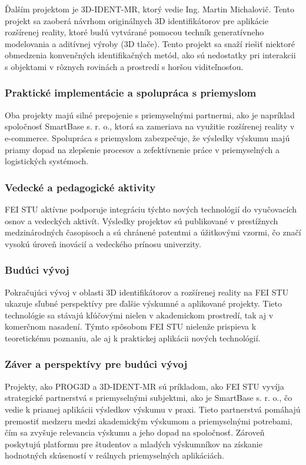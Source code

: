 Ďalším projektom je 3D-IDENT-MR, ktorý vedie Ing. Martin Michalovič. Tento projekt sa zaoberá návrhom originálnych 3D identifikátorov pre aplikácie rozšírenej reality, ktoré budú vytvárané pomocou techník generatívneho modelovania a aditívnej výroby (3D tlače). Tento projekt sa snaží riešiť niektoré obmedzenia konvenčných identifikačných metód, ako sú nedostatky pri interakcii s objektami v rôznych rovinách a prostredí s horšou viditeľnosťou.

\subsubsection{Praktické implementácie a spolupráca s priemyslom}

Oba projekty majú silné prepojenie s priemyselnými partnermi, ako je napríklad spoločnosť SmartBase s. r. o., ktorá sa zameriava na využitie rozšírenej reality v e-commerce. Spolupráca s priemyslom zabezpečuje, že výsledky výskumu majú priamy dopad na zlepšenie procesov a zefektívnenie práce v priemyselných a logistických systémoch.

\subsubsection{Vedecké a pedagogické aktivity}

FEI STU aktívne podporuje integráciu týchto nových technológií do vyučovacích osnov a vedeckých aktivít. Výsledky projektov sú publikované v prestížnych medzinárodných časopisoch a sú chránené patentmi a úžitkovými vzormi, čo značí vysokú úroveň inovácií a vedeckého prínosu univerzity.

\subsubsection{Budúci vývoj}

Pokračujúci vývoj v oblasti 3D identifikátorov a rozšírenej reality na FEI STU ukazuje sľubné perspektívy pre ďalšie výskumné a aplikované projekty. Tieto technológie sa stávajú kľúčovými nielen v akademickom prostredí, tak aj v komerčnom nasadení. Týmto spôsobom FEI STU nielenže prispieva k teoretickému poznaniu, ale aj k praktickej aplikácii nových technológií.

\subsubsection{Záver a perspektívy pre budúci vývoj}

Projekty, ako PROG3D a 3D-IDENT-MR sú príkladom, ako FEI STU vyvíja strategické partnerstvá s priemyselnými subjektmi, ako je SmartBase s. r. o., čo vedie k priamej aplikácii výsledkov výskumu v praxi. Tieto partnerstvá pomáhajú premostiť medzeru medzi akademickým výskumom a priemyselnými potrebami, čím sa zvyšuje relevancia výskumu a jeho dopad na spoločnosť. Zároveň poskytujú platformu pre študentov a mladých výskumníkov na získanie hodnotných skúseností v reálnych priemyselných aplikáciách.


